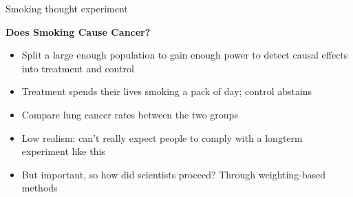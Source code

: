\documentclass{beamer}
\begin{document}
\begin{frame}{Smoking thought experiment}

	\begin{center}	
    \textbf{Does Smoking Cause Cancer?}
  \end{center}

\bigskip
\begin{itemize}
	\item Split a large enough population to gain enough power to detect causal effects into treatment and control
	\item Treatment spends their lives smoking a pack of day; control abstains
	\item Compare lung cancer rates between the two groups
	\item Low realism: can't really expect people to comply with a longterm experiment like this
	\item But important, so how did scientists proceed? Through weighting-based methods
\end{itemize}

\end{frame}
\end{document}
